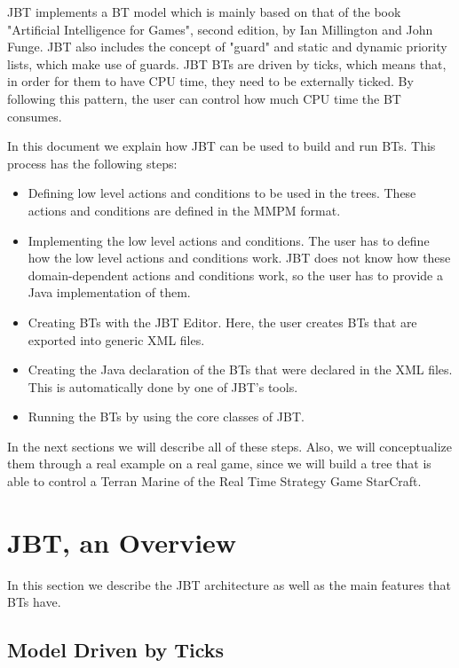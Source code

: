 \documentclass[a4paper]{article}
\newcommand{\starcraft}{StarCraft\xspace}
\begin{document}
JBT implements a BT model which is mainly based on that of the book "Artificial Intelligence for Games", second edition, by Ian Millington and John Funge. JBT also includes the concept of "guard" and static and dynamic priority lists, which make use of guards. JBT BTs are driven by ticks, which means that, in order for them to have CPU time, they need to be externally ticked. By following this pattern, the user can control how much CPU time the BT consumes.

In this document we explain how JBT can be used to build and run BTs. This process has the following steps:

\begin{itemize}
  \item Defining low level actions and conditions to be used in the trees. These actions and conditions are defined in the MMPM format.
  \item Implementing the low level actions and conditions. The user has to define how the low level actions and conditions work. JBT does not know how these domain-dependent actions and conditions work, so the user has to provide a Java implementation of them.
  \item Creating BTs with the JBT Editor. Here, the user creates BTs that are exported into generic XML files.
  \item Creating the Java declaration of the BTs that were declared in the XML files. This is automatically done by one of JBT's tools.
  \item Running the BTs by using the core classes of JBT. 
\end{itemize}

In the next sections we will describe all of these steps. Also, we will conceptualize them through a real example on a real game, since we will build a tree that is able to control a Terran Marine of the Real Time Strategy Game \starcraft.

\section{JBT, an Overview}

In this section we describe the JBT architecture as well as the main features that BTs have.

\subsection{Model Driven by Ticks}\label{sec:ModelDrivenByTicks}
\end{document}
